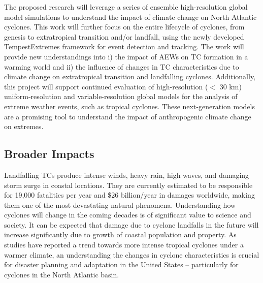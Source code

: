 \documentclass[11pt]{article}
\begin{document}
The proposed research will leverage a series of ensemble high-resolution global model simulations to understand the impact of climate change on North Atlantic cyclones. This work will further focus on the entire lifecycle of cyclones, from genesis to extratropical transition and/or landfall, using the newly developed TempestExtremes framework for event detection and tracking.  The work will provide new understandings into i) the impact of AEWs on TC formation in a warming world and ii) the influence of changes in TC characteristics due to climate change on extratropical transition and landfalling cyclones. Additionally, this project will support continued evaluation of high-resolution ($<$ 30 km) uniform-resolution and variable-resolution global models for the analysis of extreme weather events, such as tropical cyclones.  These next-generation models are a promising tool to understand the impact of anthropogenic climate change on extremes.  

\vspace{-0.7cm}
\subsection*{Broader Impacts}
\vspace{-0.6cm}

Landfalling TCs produce intense winds, heavy rain, high waves, and damaging storm surge in coastal locations. They are currently estimated to be responsible for 19,000 fatalities per year and \$26 billion/year in damages worldwide, making them one of the most devastating natural phenomena.  Understanding how cyclones will change in the coming decades is of significant value to science and society. It can be expected that damage due to cyclone landfalls in the future will increase significantly due to growth of coastal population and property.  As studies have reported a trend towards more intense tropical cyclones under a warmer climate, an understanding the changes in cyclone characteristics is crucial for disaster planning and adaptation in the United States -- particularly for cyclones in the  North Atlantic basin.
\end{document}
